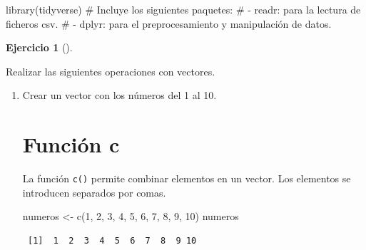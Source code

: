 \documentclass[
  a4paper,
]{scrreport}
\newenvironment{Shaded}{\begin{snugshade}}{\end{snugshade}}
\newcommand{\CommentTok}[1]{\textcolor[rgb]{0.37,0.37,0.37}{#1}}
\newcommand{\DecValTok}[1]{\textcolor[rgb]{0.68,0.00,0.00}{#1}}
\newcommand{\FunctionTok}[1]{\textcolor[rgb]{0.28,0.35,0.67}{#1}}
\newcommand{\NormalTok}[1]{\textcolor[rgb]{0.00,0.23,0.31}{#1}}
\newcommand{\OtherTok}[1]{\textcolor[rgb]{0.00,0.23,0.31}{#1}}
\theoremstyle{definition}
\newtheorem{exercise}{Ejercicio}[chapter]
\theoremstyle{remark}
\begin{document}
\begin{Shaded}
\begin{Highlighting}[]
\FunctionTok{library}\NormalTok{(tidyverse) }
\CommentTok{\# Incluye los siguientes paquetes:}
\CommentTok{\# {-} readr: para la lectura de ficheros csv. }
\CommentTok{\# {-} dplyr: para el preprocesamiento y manipulación de datos.}
\end{Highlighting}
\end{Shaded}

\begin{exercise}[]\protect\hypertarget{exr-vectores-1}{}\label{exr-vectores-1}

Realizar las siguientes operaciones con vectores.

\begin{enumerate}
\def\labelenumi{\alph{enumi}.}
\item
  Crear un vector con los números del 1 al 10.

  \begin{tcolorbox}[enhanced jigsaw, breakable, toptitle=1mm, colbacktitle=quarto-callout-tip-color!10!white, rightrule=.15mm, opacityback=0, opacitybacktitle=0.6, titlerule=0mm, coltitle=black, colframe=quarto-callout-tip-color-frame, colback=white, bottomtitle=1mm, leftrule=.75mm, toprule=.15mm, title=\textcolor{quarto-callout-tip-color}{\faLightbulb}\hspace{0.5em}{Solución}, arc=.35mm, bottomrule=.15mm, left=2mm]

  \section{Función c}

  La función \texttt{c()} permite combinar elementos en un vector. Los
  elementos se introducen separados por comas.

\begin{Shaded}
\begin{Highlighting}[]
\NormalTok{numeros }\OtherTok{\textless{}{-}} \FunctionTok{c}\NormalTok{(}\DecValTok{1}\NormalTok{, }\DecValTok{2}\NormalTok{, }\DecValTok{3}\NormalTok{, }\DecValTok{4}\NormalTok{, }\DecValTok{5}\NormalTok{, }\DecValTok{6}\NormalTok{, }\DecValTok{7}\NormalTok{, }\DecValTok{8}\NormalTok{, }\DecValTok{9}\NormalTok{, }\DecValTok{10}\NormalTok{)}
\NormalTok{numeros}
\end{Highlighting}
\end{Shaded}

\begin{verbatim}
 [1]  1  2  3  4  5  6  7  8  9 10
\end{verbatim}


\end{tcolorbox}
\end{enumerate}
\end{exercise}
\end{document}
